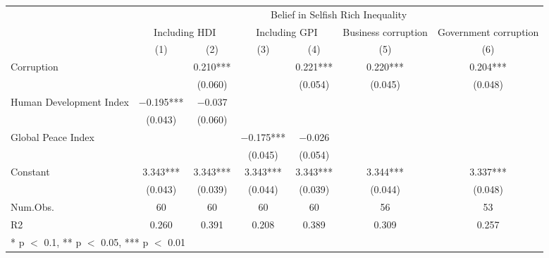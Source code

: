 \begin{table}
\centering
\begin{tabular}[t]{lcccccc}
\toprule
\multicolumn{1}{c}{ } & \multicolumn{6}{c}{Belief in Selfish Rich Inequality} \\
\cmidrule(l{3pt}r{3pt}){2-7}
\multicolumn{1}{c}{ } & \multicolumn{2}{c}{Including HDI} & \multicolumn{2}{c}{Including GPI} & \multicolumn{1}{c}{Business corruption} & \multicolumn{1}{c}{Government corruption} \\
\cmidrule(l{3pt}r{3pt}){2-3} \cmidrule(l{3pt}r{3pt}){4-5} \cmidrule(l{3pt}r{3pt}){6-6} \cmidrule(l{3pt}r{3pt}){7-7}
  & (1) & (2) & (3) & (4) & (5) & (6)\\
\midrule
Corruption &  & \num{0.210}*** &  & \num{0.221}*** & \num{0.220}*** & \num{0.204}***\\
 &  & (\num{0.060}) &  & (\num{0.054}) & (\num{0.045}) & (\num{0.048})\\
Human Development Index & \num{-0.195}*** & \num{-0.037} &  &  &  & \\
 & (\num{0.043}) & (\num{0.060}) &  &  &  & \\
Global Peace Index &  &  & \num{-0.175}*** & \num{-0.026} &  & \\
 &  &  & (\num{0.045}) & (\num{0.054}) &  & \\
Constant & \num{3.343}*** & \num{3.343}*** & \num{3.343}*** & \num{3.343}*** & \num{3.344}*** & \num{3.337}***\\
 & (\num{0.043}) & (\num{0.039}) & (\num{0.044}) & (\num{0.039}) & (\num{0.044}) & (\num{0.048})\\
\midrule
Num.Obs. & \num{60} & \num{60} & \num{60} & \num{60} & \num{56} & \num{53}\\
R2 & \num{0.260} & \num{0.391} & \num{0.208} & \num{0.389} & \num{0.309} & \num{0.257}\\
\bottomrule
\multicolumn{7}{l}{\rule{0pt}{1em}* p $<$ 0.1, ** p $<$ 0.05, *** p $<$ 0.01}\\
\end{tabular}
\end{table}